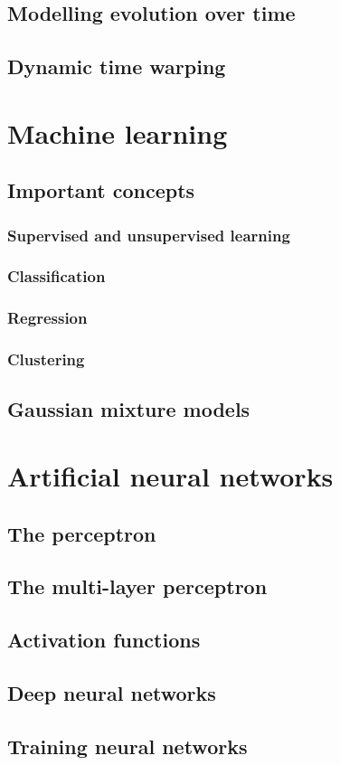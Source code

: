 \subsection{Modelling evolution over time}
\subsection{Dynamic time warping}

\section{Machine learning}
\subsection{Important concepts}
\subsubsection{Supervised and unsupervised learning}
\subsubsection{Classification}
\subsubsection{Regression}
\subsubsection{Clustering}
\subsection{Gaussian mixture models}

\section{Artificial neural networks}
\subsection{The perceptron}
\subsection{The multi-layer perceptron}
\subsection{Activation functions}
\subsection{Deep neural networks}
\subsection{Training neural networks}
